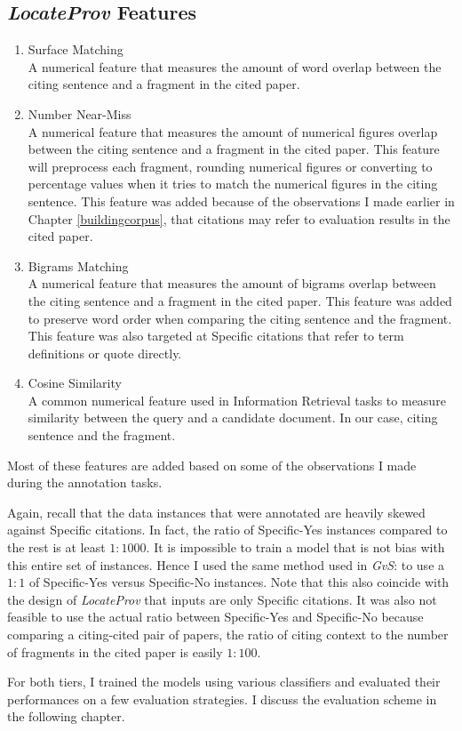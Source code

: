 \subsection*{{\it LocateProv} Features}
\begin{enumerate}
\item Surface Matching \\
A numerical feature that measures the amount of word overlap between the citing sentence and a fragment in the cited paper.

\item Number Near-Miss \\
A numerical feature that measures the amount of numerical figures overlap between the citing sentence and a fragment in the cited paper. This feature will preprocess each fragment, rounding numerical figures or converting to percentage values when it tries to match the numerical figures in the citing sentence. This feature was added because of the observations I made earlier in Chapter \ref{buildingcorpus}, that citations may refer to evaluation results in the cited paper.

\item Bigrams Matching \\
A numerical feature that measures the amount of bigrams overlap between the citing sentence and a fragment in the cited paper. This feature was added to preserve word order when comparing the citing sentence and the fragment. This feature was also targeted at Specific citations that refer to term definitions or quote directly.

\item Cosine Similarity \\
A common numerical feature used in Information Retrieval tasks to measure similarity between the query and a candidate document. In our case, citing sentence and the fragment.
\end{enumerate}
Most of these features are added based on some of the observations I made during the annotation tasks.

Again, recall that the data instances that were annotated are heavily skewed against Specific citations. In fact, the ratio of Specific-Yes instances compared to the rest is at least $1:1000$. It is impossible to train a model that is not bias with this entire set of instances. Hence I used the same method used in {\it GvS}: to use a $1:1$ of Specific-Yes versus Specific-No instances. Note that this also coincide with the design of {\it LocateProv} that inputs are only Specific citations. It was also not feasible to use the actual ratio between Specific-Yes and Specific-No because comparing a citing-cited pair of papers, the ratio of citing context to the number of fragments in the cited paper is easily $1:100$.

For both tiers, I trained the models using various classifiers and evaluated their performances on a few evaluation strategies. I discuss the evaluation scheme in the following chapter.